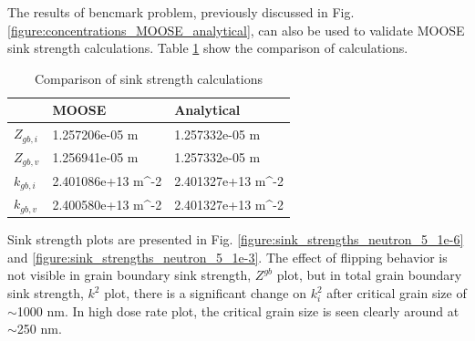 \documentclass[a4paper]{article}
\begin{document}
  The results of bencmark problem, previously discussed in Fig. \ref{figure:concentrations_MOOSE_analytical}, can also be used to validate MOOSE sink strength calculations. Table \ref{table:sink_strengths_calculations} show the comparison of calculations.
    \begin{table}[h!]
      \centering
      \caption{Comparison of sink strength calculations}
      \label{table:sink_strengths_calculations}
      \begin{tabular}{ ||p{2cm}|p{3cm}|p{3cm}||  }
         \hline
          & MOOSE & Analytical\\
         \hline\hline\hline
         ${Z_{gb,i}}$  & 1.257206e-05 m & 1.257332e-05 m\\
         ${Z_{gb,v}}$  & 1.256941e-05 m & 1.257332e-05 m\\
         ${k_{gb,i}}$  & 2.401086e+13 m^{-2} & 2.401327e+13 m^{-2}\\
         ${k_{gb,v}}$  & 2.400580e+13 m^{-2} & 2.401327e+13 m^{-2}\\
         \hline
      \end{tabular}
    \end{table}
    \newpage
    Sink strength plots are presented in Fig. \ref{figure:sink_strengths_neutron_5_1e-6} and \ref{figure:sink_strengths_neutron_5_1e-3}. The effect of flipping behavior is not visible in grain boundary sink strength, ${Z^{gb}}$ plot, but in total grain boundary sink strength, ${k^2}$ plot, there is a significant change on ${k^2_i}$ after critical grain size of ${\sim}$1000 nm. In high dose rate plot, the critical grain size is seen clearly around at ${\sim}$250 nm.
\end{document}
